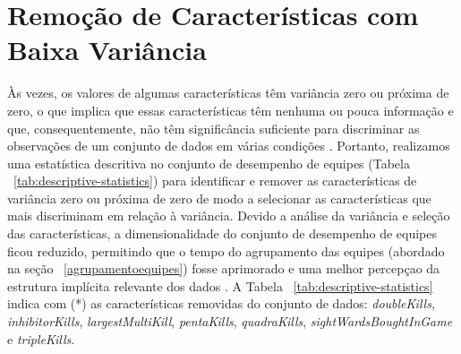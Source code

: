 \section{Remoção de Características com Baixa Variância}
Às vezes, os valores de algumas características têm variância zero ou próxima de zero, o que implica que essas características têm nenhuma ou pouca informação e que, consequentemente, não têm significância suficiente para discriminar as observações de um conjunto de dados em várias condições \cite{qing2014feature}. Portanto, realizamos uma estatística descritiva no conjunto de desempenho de equipes (Tabela ~\ref{tab:descriptive-statistics}) para identificar e remover as características de variância zero ou próxima de zero de modo a selecionar as características que mais discriminam em relação à variância. Devido a análise da variância e seleção das características, a dimensionalidade do conjunto de desempenho de equipes ficou reduzido, permitindo que o tempo do agrupamento das equipes (abordado na seção ~\ref{agrupamentoequipes}) fosse aprimorado e uma melhor percepçao da estrutura implícita relevante dos dados \cite{boutsidis2009unsupervised}. A Tabela ~\ref{tab:descriptive-statistics} indica com (*) as características removidas do conjunto de dados: \textit{doubleKills}, \textit{inhibitorKills}, \textit {largestMultiKill}, \textit{pentaKills}, \textit {quadraKills}, \textit {sightWardsBoughtInGame} e \textit{tripleKills}.


